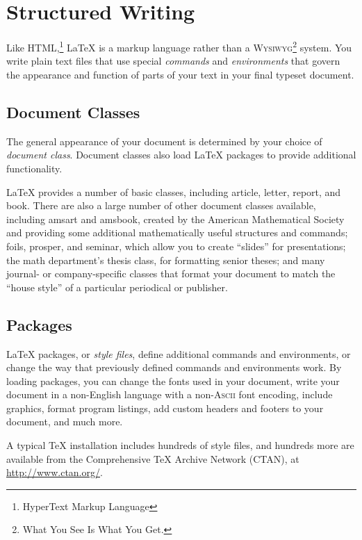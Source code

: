 \documentclass{icmmcm}
\newcommand{\acronym}[1]{\textsc{#1}\xspace}
\newcommand{\key}[1]{\textsf{\emph{#1}}\xspace}
\newcommand{\class}[1]{\textsf{#1}\xspace}
\newcommand{\tex}{\TeX\xspace}
\newcommand{\latex}{\LaTeX\xspace}
\begin{document}
\section{Structured Writing}%
\label{sec:structured-writing}

Like HTML,\footnote{HyperText Markup Language} \latex is a markup
language rather than a \acronym{Wysiwyg}{}\footnote{What You See Is
  What You Get.}  system.  You write plain text files that use special
\key{commands} and \key{environments} that govern the appearance and
function of parts of your text in your final typeset document.


\subsection{Document Classes}%
\label{sec:document-classes}

The general appearance of your document is determined by your choice
of \key{document class}.  Document classes also load \latex packages
to provide additional functionality.

\latex provides a number of basic classes, including \class{article},
\class{letter}, \class{report}, and \class{book}.  There are also a
large number of other document classes available, including
\class{amsart} and \class{amsbook}, created by the American
Mathematical Society and providing some additional mathematically
useful structures and commands; \class{foils}, \class{prosper}, and
\class{seminar}, which allow you to create ``slides'' for
presentations; the math department's \class{thesis} class, for
formatting senior theses; and many journal- or company-specific
classes that format your document to match the ``house style'' of a
particular periodical or publisher.


\subsection{Packages}%
\label{sec:packages}%
\label{sec:ctan}

\latex packages, or \key{style files}, define additional commands and
environments, or change the way that previously defined commands and
environments work.  By loading packages, you can change the fonts used
in your document, write your document in a non-English language with a
non-\acronym{Ascii} font encoding, include graphics, format program
listings, add custom headers and footers to your document, and much
more.

A typical \tex installation includes hundreds of style files, and
hundreds more are available from the Comprehensive \tex Archive
Network (CTAN), at \url{http://www.ctan.org/}.
\end{document}
